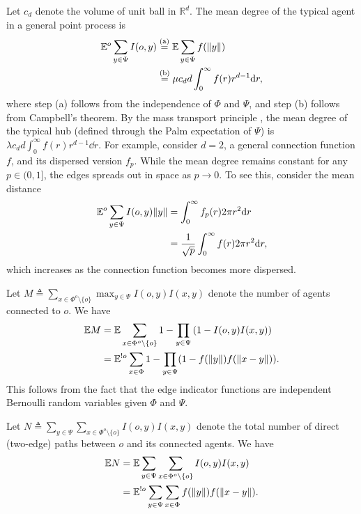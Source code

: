 Let $c_d$ denote the volume of unit ball in $\mathbb{R}^d$.
The mean degree of the typical agent in a general point process is 
    \begin{align}
  \mathbb{E}^{o} \sum_{y\in\Psi}I(o,y)
       &\stackrel{\text{\scriptsize(a)}}{=} \mathbb{E} \sum_{y\in\Psi}f(\|y\|)\nonumber
      \\
      &\stackrel{\text{\scriptsize(b)}}{=} \mu c_d d \int_{0}^{\infty}f(r) r^{d-1} \mathrm{d} r,\label{eq: EN_hub}
    \end{align}
    where step (a) follows from the independence of $\Phi$ and $\Psi$, and step (b) follows from Campbell's theorem. 
    By the mass transport principle \cite{baccelli:hal-02460214}, the mean degree of the typical hub (defined through the Palm expectation of $\Psi$) is $\lambda c_d d \int_{0}^{\infty}f(r) r^{d-1} \dd r.$ %
    For example, consider $d=2$, a general connection function $f$, and its dispersed version $f_{p}$. While the mean degree remains constant for any $p\in(0,1]$,
 the edges spreads out in space as $p\to 0$. To see this, consider the mean distance
 \begin{align}
 \mathbb{E}^{o} \sum_{y\in\Psi}I(o,y)\|y\| &=\int_{0}^{\infty}f_p(r)2\pi r^2 \mathrm{d} r\nonumber \\
 & = \frac{1}{\sqrt{p}}\int_{0}^{\infty}f(r)2\pi r^2 \mathrm{d} r,\nonumber
 \end{align}
which increases as the connection function becomes more dispersed.


    
 Let $M\triangleq\sum_{x\in\Phi^o\setminus\{o\}}\max_{y\in\Psi} I(o,y)I(x,y)$ denote the number of agents connected to $o$.  We have
    \begin{align}
        \mathbb{E} M &= \mathbb{E}\sum_{x\in\Phi^o\setminus\{o\} } 1-\prod_{y\in\Psi} \left(1-I(o,y)I(x,y)\right) \nonumber\\
        &= \mathbb{E}^{!o} \sum_{x\in\Phi} 1-\prod_{y\in\Psi} (1-f(\|y\|)f(\|x-y\|)).\nonumber
        \end{align}
    This follows from the fact that the edge indicator functions are independent Bernoulli random variables given $\Phi$ and $\Psi$.
    
    Let $N\triangleq\sum_{y\in\Psi}\sum_{x \in\Phi^o\setminus\{o\}} I(o,y)I(x,y)$ denote the total number of direct (two-edge) paths between $o$ and its connected agents. We have
    \begin{align}
       \mathbb{E} N  &= \mathbb{E} \sum_{y\in\Psi}\sum_{x \in\Phi^o\setminus\{o\}} I(o,y)I(x,y) \nonumber\\
       &= \mathbb{E}^{!o}\sum_{y\in\Psi}\sum_{x \in\Phi}f(\|y\|)f(\|x-y\|).\nonumber
    \end{align}  
    

